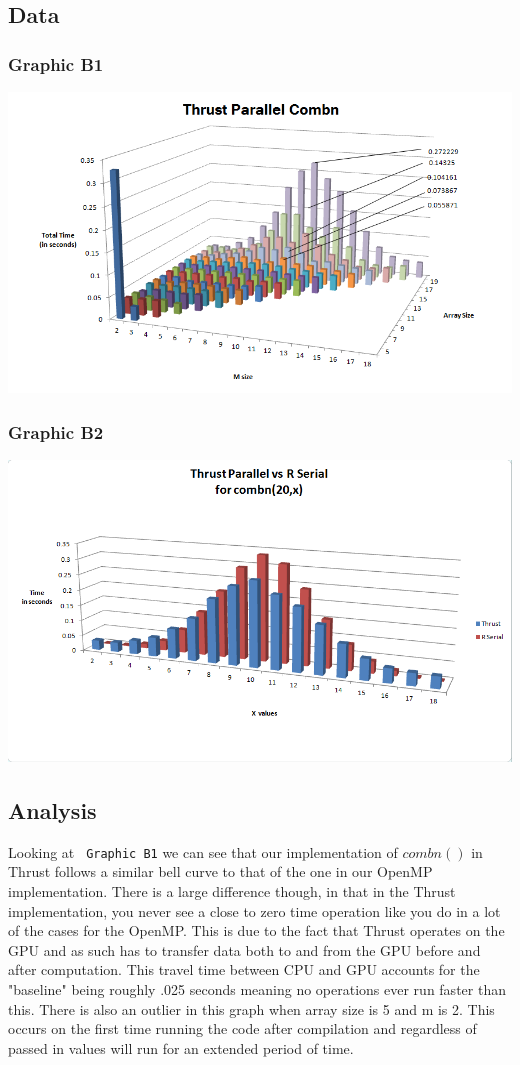 \documentclass[titlepage, 11pt]{article}
\begin{document}
\subsection{Data}
\subsubsection{Graphic B1}
\includegraphics[scale = 0.5]{images/3D-Thrust.png} \\
\subsubsection{Graphic B2}
\includegraphics[scale = 0.5]{images/ThrustvsR.png}

\subsection{Analysis}
Looking at \verb; Graphic B1; we can see that our implementation of $combn()$ in Thrust follows a similar bell curve to that of the one in our OpenMP implementation. There is a large difference though, in that in the Thrust implementation, you never see a close to zero time operation like you do in a lot of the cases for the OpenMP. This is due to the fact that Thrust operates on the GPU and as such has to transfer data both to and from the GPU before and after computation. This travel time between CPU and GPU accounts for the "baseline" being roughly .025 seconds meaning no operations ever run faster than this. There is also an outlier in this graph when array size is 5 and m is 2. This occurs on the first time running the code after compilation and regardless of passed in values will run for an extended period of time.
\end{document}
